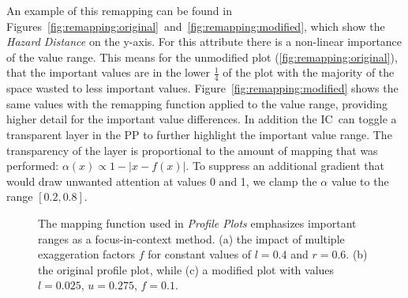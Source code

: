 \documentclass[review,journal]{vgtc}         %
\def\IC{IC}
\begin{document}
An example of this remapping can be found in Figures~\ref{fig:remapping:original}~and~\ref{fig:remapping:modified}, which show the \emph{Hazard Distance} on the y-axis. For this attribute there is a non-linear importance of the value range. This means for the unmodified plot (\ref{fig:remapping:original}), that the important values are in the lower $\frac{1}{4}$ of the plot with the majority of the space wasted to less important values. Figure~\ref{fig:remapping:modified} shows the same values with the remapping function applied to the value range, providing higher detail for the important value differences. In addition the \IC\ can toggle a transparent layer in the PP to further highlight the important value range. The transparency of the layer is proportional to the amount of mapping that was performed: $\alpha(x) \propto 1 - \left| x - f(x) \right|$. To suppress an additional gradient that would draw unwanted attention at values 0 and 1, we clamp the $\alpha$ value to the range $[0.2,0.8]$.

\begin{figure}[b]
\vspace{-0.2cm}
\centering
{}
\hfill
{}
\hfill
{}
\caption{The mapping function used in \emph{Profile Plots} emphasizes important ranges as a focus-in-context method. (a) the impact of multiple exaggeration factors $f$ for constant values of $l=0.4$ and $r=0.6$. (b) the original profile plot, while (c) a modified plot with values $l=0.025$, $u=0.275$, $f=0.1$.}
\label{fig:remapping}
\end{figure}
\end{document}
